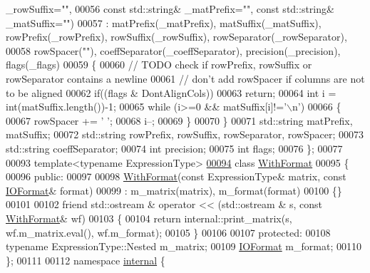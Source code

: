 \begin{DoxyCode}
      \_rowSuffix=\textcolor{stringliteral}{""},
00056     \textcolor{keyword}{const} std::string& \_matPrefix=\textcolor{stringliteral}{""}, \textcolor{keyword}{const} std::string& \_matSuffix=\textcolor{stringliteral}{""})
00057   : matPrefix(\_matPrefix), matSuffix(\_matSuffix), rowPrefix(\_rowPrefix), rowSuffix(\_rowSuffix), 
      rowSeparator(\_rowSeparator),
00058     rowSpacer(\textcolor{stringliteral}{""}), coeffSeparator(\_coeffSeparator), precision(\_precision), flags(\_flags)
00059   \{
00060     \textcolor{comment}{// TODO check if rowPrefix, rowSuffix or rowSeparator contains a newline}
00061     \textcolor{comment}{// don't add rowSpacer if columns are not to be aligned}
00062     \textcolor{keywordflow}{if}((flags & DontAlignCols))
00063       \textcolor{keywordflow}{return};
00064     \textcolor{keywordtype}{int} i = int(matSuffix.length())-1;
00065     \textcolor{keywordflow}{while} (i>=0 && matSuffix[i]!=\textcolor{charliteral}{'\(\backslash\)n'})
00066     \{
00067       rowSpacer += \textcolor{charliteral}{' '};
00068       i--;
00069     \}
00070   \}
00071   std::string matPrefix, matSuffix;
00072   std::string rowPrefix, rowSuffix, rowSeparator, rowSpacer;
00073   std::string coeffSeparator;
00074   \textcolor{keywordtype}{int} precision;
00075   \textcolor{keywordtype}{int} flags;
00076 \};
00077 
00093 \textcolor{keyword}{template}<\textcolor{keyword}{typename} ExpressionType>
\hyperlink{group___core___module}{00094} \textcolor{keyword}{class }\hyperlink{group___core___module_class_eigen_1_1_with_format}{WithFormat}
00095 \{
00096   \textcolor{keyword}{public}:
00097 
00098     \hyperlink{group___core___module_class_eigen_1_1_with_format}{WithFormat}(\textcolor{keyword}{const} ExpressionType& matrix, \textcolor{keyword}{const} \hyperlink{group___core___module_struct_eigen_1_1_i_o_format}{IOFormat}& format)
00099       : m\_matrix(matrix), m\_format(format)
00100     \{\}
00101 
00102     \textcolor{keyword}{friend} std::ostream & operator << (std::ostream & s, \textcolor{keyword}{const} \hyperlink{group___core___module_class_eigen_1_1_with_format}{WithFormat}& wf)
00103     \{
00104       \textcolor{keywordflow}{return} internal::print\_matrix(s, wf.m\_matrix.eval(), wf.m\_format);
00105     \}
00106 
00107   \textcolor{keyword}{protected}:
00108     \textcolor{keyword}{typename} ExpressionType::Nested m\_matrix;
00109     \hyperlink{group___core___module_struct_eigen_1_1_i_o_format}{IOFormat} m\_format;
00110 \};
00111 
00112 \textcolor{keyword}{namespace }\hyperlink{namespaceinternal}{internal} \{

\end{DoxyCode}
